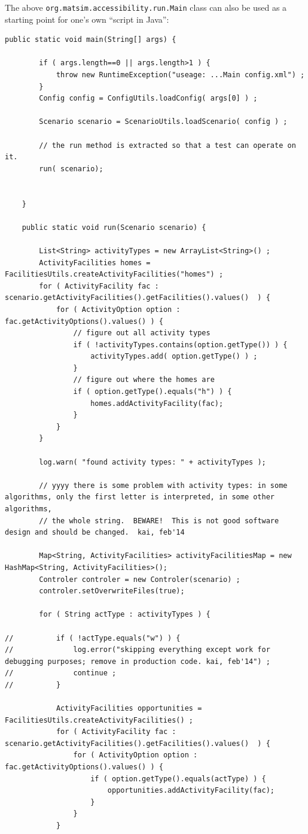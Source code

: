 The above \lstinline$org.matsim.accessibility.run.Main$ class can also be used as a starting point for one's own ``script in Java'':
\begin{lstlisting}
public static void main(String[] args) {

		if ( args.length==0 || args.length>1 ) {
			throw new RuntimeException("useage: ...Main config.xml") ;
		}
		Config config = ConfigUtils.loadConfig( args[0] ) ;
		
		Scenario scenario = ScenarioUtils.loadScenario( config ) ;
		
		// the run method is extracted so that a test can operate on it.
		run( scenario);
		
		
	}

	public static void run(Scenario scenario) {
		
		List<String> activityTypes = new ArrayList<String>() ;
		ActivityFacilities homes = FacilitiesUtils.createActivityFacilities("homes") ;
		for ( ActivityFacility fac : scenario.getActivityFacilities().getFacilities().values()  ) {
			for ( ActivityOption option : fac.getActivityOptions().values() ) {
				// figure out all activity types
				if ( !activityTypes.contains(option.getType()) ) {
					activityTypes.add( option.getType() ) ;
				}
				// figure out where the homes are
				if ( option.getType().equals("h") ) {
					homes.addActivityFacility(fac);
				}
			}
		}
		
		log.warn( "found activity types: " + activityTypes ); 
		
		// yyyy there is some problem with activity types: in some algorithms, only the first letter is interpreted, in some other algorithms,
		// the whole string.  BEWARE!  This is not good software design and should be changed.  kai, feb'14
		
		Map<String, ActivityFacilities> activityFacilitiesMap = new HashMap<String, ActivityFacilities>();
		Controler controler = new Controler(scenario) ;
		controler.setOverwriteFiles(true);

		for ( String actType : activityTypes ) {
			
//			if ( !actType.equals("w") ) {
//				log.error("skipping everything except work for debugging purposes; remove in production code. kai, feb'14") ;
//				continue ;
//			}
			
			ActivityFacilities opportunities = FacilitiesUtils.createActivityFacilities() ;
			for ( ActivityFacility fac : scenario.getActivityFacilities().getFacilities().values()  ) {
				for ( ActivityOption option : fac.getActivityOptions().values() ) {
					if ( option.getType().equals(actType) ) {
						opportunities.addActivityFacility(fac);
					}
				}
			}
			

\end{lstlisting}
